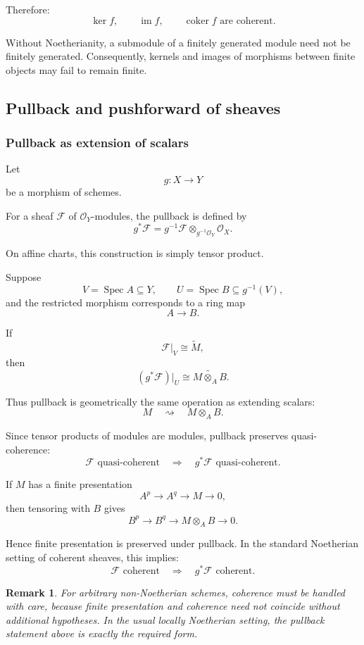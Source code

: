 \documentclass[12pt,a4paper]{article}
\DeclareMathOperator{\im}{im}
\DeclareMathOperator{\coker}{coker}
\DeclareMathOperator{\Spec}{Spec}
\newcommand{\OO}{\mathcal{O}}
\providecommand{\Spec}{\operatorname{Spec}}
\theoremstyle{notespace}
\newtheorem{remark}[definition]{Remark}
\begin{document}
Therefore:
\[
\boxed{
	\ker f,\qquad
	\im f,\qquad
	\coker f
	\text{ are coherent.}
}
\]

Without Noetherianity, a submodule of a finitely generated module need not be finitely generated. Consequently, kernels and images of morphisms between finite objects may fail to remain finite.

\subsection{Pullback and pushforward of sheaves}

\subsubsection{Pullback as extension of scalars}

Let
\[
g:X\longrightarrow Y
\]
be a morphism of schemes.

For a sheaf \(\mathcal{F}\) of \(\OO_Y\)-modules, the pullback is defined by
\[
g^*\mathcal{F}
=
g^{-1}\mathcal{F}
\otimes_{g^{-1}\OO_Y}
\OO_X.
\]

On affine charts, this construction is simply tensor product.

Suppose
\[
V=\Spec A\subseteq Y,
\qquad
U=\Spec B\subseteq g^{-1}(V),
\]
and the restricted morphism corresponds to a ring map
\[
A\longrightarrow B.
\]

If
\[
\mathcal{F}|_V\cong\widetilde{M},
\]
then
\[
(g^*\mathcal{F})|_U
\cong
\widetilde{M\otimes_A B}.
\]

Thus pullback is geometrically the same operation as extending scalars:
\[
M
\quad\rightsquigarrow\quad
M\otimes_A B.
\]

Since tensor products of modules are modules, pullback preserves quasi-coherence:
\[
\boxed{
	\mathcal{F}\text{ quasi-coherent}
	\quad\Longrightarrow\quad
	g^*\mathcal{F}\text{ quasi-coherent}.
}
\]

If \(M\) has a finite presentation
\[
A^p\longrightarrow A^q\longrightarrow M\longrightarrow 0,
\]
then tensoring with \(B\) gives
\[
B^p\longrightarrow B^q\longrightarrow M\otimes_A B\longrightarrow 0.
\]

Hence finite presentation is preserved under pullback. In the standard Noetherian setting of coherent sheaves, this implies:
\[
\boxed{
	\mathcal{F}\text{ coherent}
	\quad\Longrightarrow\quad
	g^*\mathcal{F}\text{ coherent}.
}
\]

\begin{remark}
	For arbitrary non-Noetherian schemes, coherence must be handled with care, because finite presentation and coherence need not coincide without additional hypotheses. In the usual locally Noetherian setting, the pullback statement above is exactly the required form.
\end{remark}
\end{document}
